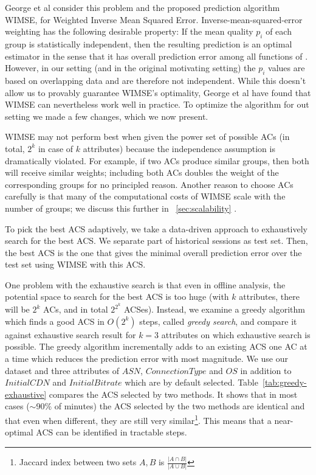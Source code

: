 George et al \cite{george2008value} consider this problem and the proposed prediction algorithm WIMSE, for Weighted Inverse Mean Squared Error.  Inverse-mean-squared-error weighting has the following desirable property: If the mean quality $p_i$ of each group is statistically independent, then the resulting prediction is an optimal estimator in the sense that it has overall prediction error among all functions of \cite{Henry, what is this?}.  However, in our setting (and in the original motivating setting) the $p_i$ values are based on overlapping data and are therefore not independent.  
While this doesn't allow us to provably guarantee WIMSE's optimality, George et al have found that WIMSE can nevertheless work well in practice.  To optimize the algorithm for out setting we made a few changes, which we now present. 



\label{subsec:acs}
WIMSE may not perform best when given the power set of possible ACs (in total, $2^k$ in case of $k$ attributes) because the independence assumption is dramatically violated.  For example, if two ACs produce similar groups, then both will receive similar weights; including both ACs doubles the weight of the corresponding groups for no principled reason.
 Another reason to choose ACs carefully is that many of the computational costs of WIMSE scale with the number of groups; we discuss this further in \Section~\ref{sec:scalability} .

To pick the best ACS adaptively, we take a data-driven approach to exhaustively search for the best ACS. We separate part of historical sessions as test set. Then, the best ACS is the one that gives the minimal overall prediction error over the test set using WIMSE with this ACS.

 One problem with the exhaustive search is that even in offline analysis, the potential space to search for the best ACS is too huge (with $k$ attributes, there will be $2^k$ ACs, and in total $2^{2^k}$ ACSes). Instead, we examine a greedy algorithm which finds a good ACS in $O(2^k)$ steps, called {\it greedy search}, and compare it against exhaustive search result for $k=3$ attributes on which exhaustive search is possible. The greedy algorithm incrementally adds to an existing ACS one AC at a time which reduces the prediction error with most magnitude.
We use our dataset and three attributes of $ASN$, $ConnectionType$ and $OS$ in addition to $Initial CDN$ and $Initial Bitrate$ which are by default selected.
Table~\ref{tab:greedy-exhaustive} compares the ACS selected by two methods. It shows that in most cases ($\sim$90\% of minutes) the ACS selected by the two methods are identical and that even when different, they are still very similar\footnote{Jaccard index between two sets $A,B$ is $\frac{|A\cap B|}{|A\cup B|}$}. This means that a near-optimal ACS can be identified in tractable steps.

